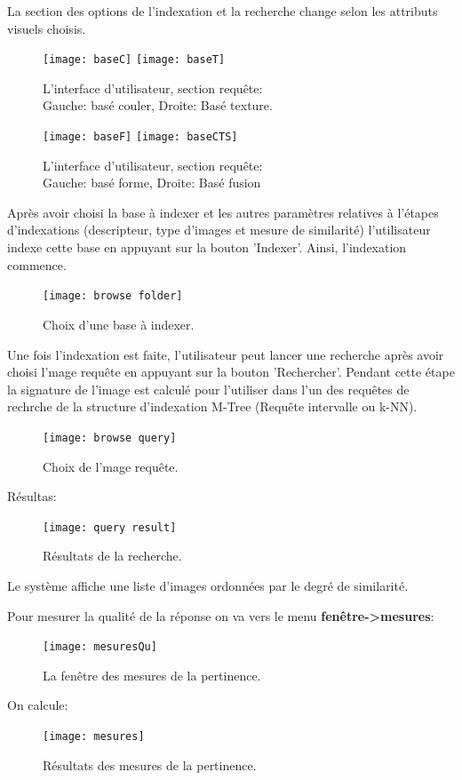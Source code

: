 La section des options de l'indexation et la recherche change selon les attributs visuels choisis.

\begin{figure}[H]
	\centering
	\texttt{[image: baseC]} \space
	\texttt{[image: baseT]} 
	\caption{L'interface d’utilisateur, section requête: \\
	Gauche: basé couler, Droite: Basé texture.}
\end{figure}
\begin{figure}[H]
	\centering
	\texttt{[image: baseF]} \space
	\texttt{[image: baseCTS]} 
	\caption{L'interface d’utilisateur, section requête: \\
		Gauche: basé forme, Droite: Basé fusion}
\end{figure}


Après avoir choisi la base à indexer et les autres paramètres relatives à l'étapes d'indexations (descripteur, type d'images et mesure de similarité) l’utilisateur indexe cette base en appuyant sur la bouton 'Indexer'. Ainsi, l'indexation commence. \\

\begin{figure}[H]
	\centering
	\texttt{[image: browse folder]} 
	\caption{Choix d'une base à indexer.}
\end{figure}

Une fois l'indexation est faite, l’utilisateur peut lancer une recherche après avoir choisi l'mage requête en appuyant sur la bouton 'Rechercher'. Pendant cette étape la signature de l’image est calculé pour l'utiliser dans l'un des requêtes de rechrche de la structure d'indexation M-Tree (Requête intervalle ou k-NN).\\

\begin{figure}[H]
	\centering
	\texttt{[image: browse query]} 
	\caption{Choix de l'mage requête.}
\end{figure}
Résultas:
\begin{figure}[H]
	\centering
	\texttt{[image: query result]} 
	\caption{Résultats de la recherche.}
\end{figure}

Le système affiche une liste d'images ordonnées par le degré de similarité.

Pour mesurer la qualité de la réponse on va vers le menu \textbf{fenêtre->mesures}:
\begin{figure}[H]
	\centering
	\texttt{[image: mesuresQu]} 
	\caption{La fenêtre des mesures de la pertinence.}
\end{figure}
On calcule:
\begin{figure}[H]
	\centering
	\texttt{[image: mesures]} 
	\caption{Résultats des mesures de la pertinence.}
\end{figure}

